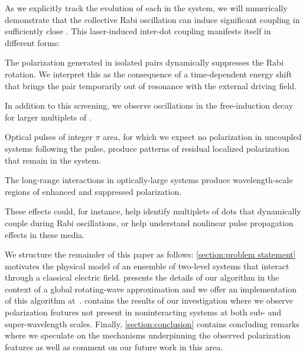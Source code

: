 As we explicitly track the evolution of each \qd{} in the system, we will numerically demonstrate that the collective Rabi oscillation can induce significant coupling in sufficiently close \qds{}.
This laser-induced inter-dot coupling manifests itself in different forms:
\begin{inparaenum}[(i)]
  \item The polarization generated in isolated \qd{} pairs dynamically suppresses the Rabi rotation.
  We interpret this as the consequence of a time-dependent energy shift that brings the pair temporarily out of resonance with the external driving field.
  \item In addition to this screening, we observe oscillations in the free-induction decay for larger multiplets of \qds{}.
  \item Optical pulses of integer $\pi$ area, for which we expect no polarization in uncoupled systems following the pulse, produce patterns of residual localized polarization that remain in the system.
  \item The long-range interactions in optically-large systems produce wavelength-scale regions of enhanced and suppressed polarization.
\end{inparaenum}
These effects could, for instance, help identify multiplets of dots that dynamically couple during Rabi oscillations, or help understand nonlinear pulse propagation effects in these media.

We structure the remainder of this paper as follows: \cref{section:problem statement} motivates the physical model of an ensemble of two-level systems that interact through a classical electric field.
 presents the details of our algorithm in the context of a global rotating-wave approximation and we offer an implementation of this algorithm at~\textcolor{orange}{\cite{githubpage}}.
 contains the results of our investigation where we observe polarization features not present in noninteracting systems at both sub- and super-wavelength scales.
Finally, \cref{section:conclusion} contains concluding remarks where we speculate on the mechanisms underpinning the observed polarization features as well as comment on our future work in this area.
